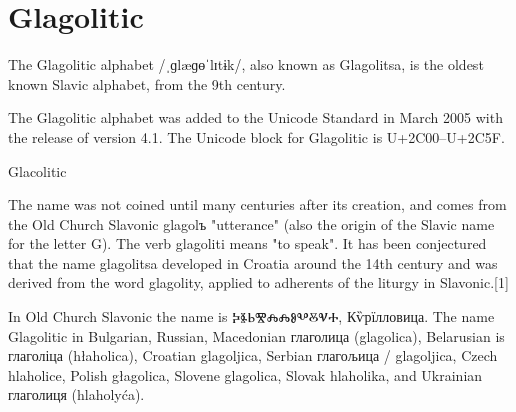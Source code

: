 \newfontfamily{}

\section{Glagolitic}

\noindent
The Glagolitic alphabet /{\glagolithic ˌɡlæɡɵˈlɪtɨk/}, also known as Glagolitsa, is the oldest known Slavic alphabet, from the 9th century.

The Glagolitic alphabet was added to the Unicode Standard in March 2005 with the release of version 4.1.
The Unicode block for Glagolitic is U+2C00–U+2C5F.



\begin{scriptexample}[]{Glacolitic}


\end{scriptexample}
\arial

The name was not coined until many centuries after its creation, and comes from the Old Church Slavonic glagolъ "utterance" (also the origin of the Slavic name for the letter G). The verb glagoliti means "to speak". It has been conjectured that the name glagolitsa developed in Croatia around the 14th century and was derived from the word glagolity, applied to adherents of the liturgy in Slavonic.[1]

In Old Church Slavonic the name is {\glagolithic ⰍⰫⰓⰊⰎⰎⰑⰂⰋⰜⰀ}, Кѷрїлловица.
The name Glagolitic in Bulgarian, Russian, Macedonian глаголица (glagolica), Belarusian is глаголіца (hłaholica), Croatian glagoljica, Serbian глагољица / glagoljica, Czech hlaholice, Polish głagolica, Slovene glagolica, Slovak hlaholika, and Ukrainian глаголиця (hlaholyća).